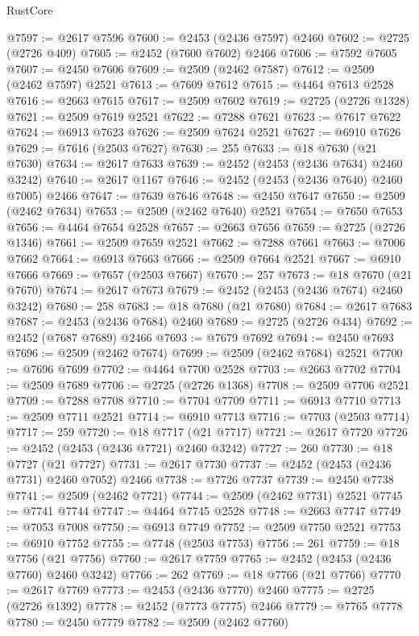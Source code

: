\begin{lexlean}{RustCore}
\begin{coremodule}
@7597 := @2617 @7596
@7600 := @2453 (@2436 @7597) @2460
@7602 := @2725 (@2726 @409)
@7605 := @2452 (@7600 @7602) @2466
@7606 := @7592 @7605
@7607 := @2450 @7606
@7609 := @2509 (@2462 @7587)
@7612 := @2509 (@2462 @7597) @2521
@7613 := @7609 @7612
@7615 := @4464 @7613 @2528
@7616 := @2663 @7615
@7617 := @2509 @7602
@7619 := @2725 (@2726 @1328)
@7621 := @2509 @7619 @2521
@7622 := @7288 @7621
@7623 := @7617 @7622
@7624 := @6913 @7623
@7626 := @2509 @7624 @2521
@7627 := @6910 @7626
@7629 := @7616 (@2503 @7627)
@7630 := 255
@7633 := @18 @7630 (@21 @7630)
@7634 := @2617 @7633
@7639 := @2452 (@2453 (@2436 @7634) @2460 @3242)
@7640 := @2617 @1167
@7646 := @2452 (@2453 (@2436 @7640) @2460 @7005) @2466
@7647 := @7639 @7646
@7648 := @2450 @7647
@7650 := @2509 (@2462 @7634)
@7653 := @2509 (@2462 @7640) @2521
@7654 := @7650 @7653
@7656 := @4464 @7654 @2528
@7657 := @2663 @7656
@7659 := @2725 (@2726 @1346)
@7661 := @2509 @7659 @2521
@7662 := @7288 @7661
@7663 := @7006 @7662
@7664 := @6913 @7663
@7666 := @2509 @7664 @2521
@7667 := @6910 @7666
@7669 := @7657 (@2503 @7667)
@7670 := 257
@7673 := @18 @7670 (@21 @7670)
@7674 := @2617 @7673
@7679 := @2452 (@2453 (@2436 @7674) @2460 @3242)
@7680 := 258
@7683 := @18 @7680 (@21 @7680)
@7684 := @2617 @7683
@7687 := @2453 (@2436 @7684) @2460
@7689 := @2725 (@2726 @434)
@7692 := @2452 (@7687 @7689) @2466
@7693 := @7679 @7692
@7694 := @2450 @7693
@7696 := @2509 (@2462 @7674)
@7699 := @2509 (@2462 @7684) @2521
@7700 := @7696 @7699
@7702 := @4464 @7700 @2528
@7703 := @2663 @7702
@7704 := @2509 @7689
@7706 := @2725 (@2726 @1368)
@7708 := @2509 @7706 @2521
@7709 := @7288 @7708
@7710 := @7704 @7709
@7711 := @6913 @7710
@7713 := @2509 @7711 @2521
@7714 := @6910 @7713
@7716 := @7703 (@2503 @7714)
@7717 := 259
@7720 := @18 @7717 (@21 @7717)
@7721 := @2617 @7720
@7726 := @2452 (@2453 (@2436 @7721) @2460 @3242)
@7727 := 260
@7730 := @18 @7727 (@21 @7727)
@7731 := @2617 @7730
@7737 := @2452 (@2453 (@2436 @7731) @2460 @7052) @2466
@7738 := @7726 @7737
@7739 := @2450 @7738
@7741 := @2509 (@2462 @7721)
@7744 := @2509 (@2462 @7731) @2521
@7745 := @7741 @7744
@7747 := @4464 @7745 @2528
@7748 := @2663 @7747
@7749 := @7053 @7008
@7750 := @6913 @7749
@7752 := @2509 @7750 @2521
@7753 := @6910 @7752
@7755 := @7748 (@2503 @7753)
@7756 := 261
@7759 := @18 @7756 (@21 @7756)
@7760 := @2617 @7759
@7765 := @2452 (@2453 (@2436 @7760) @2460 @3242)
@7766 := 262
@7769 := @18 @7766 (@21 @7766)
@7770 := @2617 @7769
@7773 := @2453 (@2436 @7770) @2460
@7775 := @2725 (@2726 @1392)
@7778 := @2452 (@7773 @7775) @2466
@7779 := @7765 @7778
@7780 := @2450 @7779
@7782 := @2509 (@2462 @7760)

\end{coremodule}
\end{lexlean}
